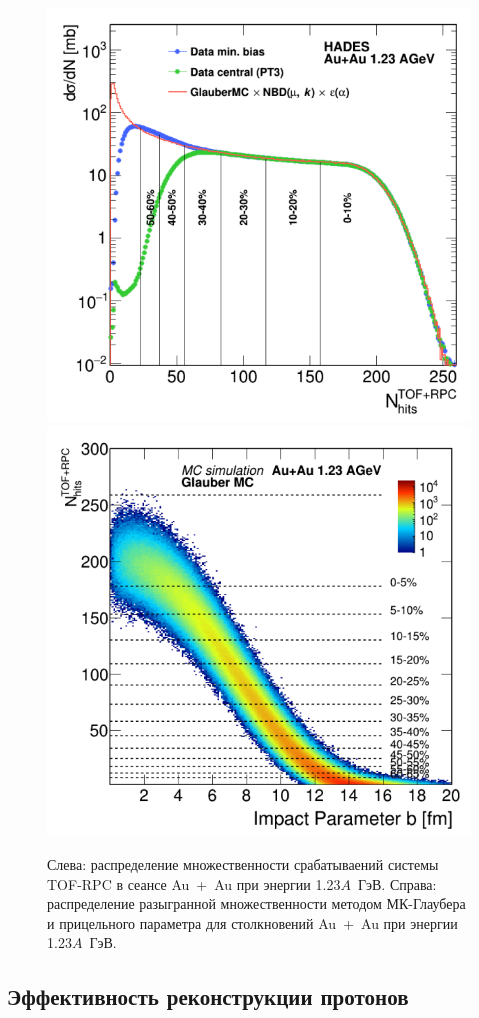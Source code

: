 \begin{figure}[ht]
\begin{center}
    \includegraphics[width=0.45\linewidth]{images/mc_glauber_auau_mult.png}
    \includegraphics[width=0.45\linewidth]{images/mc_glauber_auau_b_mult.png}
    \caption{Слева: распределение множественности срабатываений системы TOF-RPC в сеансе Au~+~Au при энергии 1.23$A$~ГэВ. Справа: распределение разыгранной множественности методом МК-Глаубера и прицельного параметра для столкновений Au~+~Au при энергии 1.23$A$~ГэВ.}
    \label{fig:mc_glauber_auau}
\end{center}
\end{figure}
    

\subsection{Эффективность реконструкции протонов}

